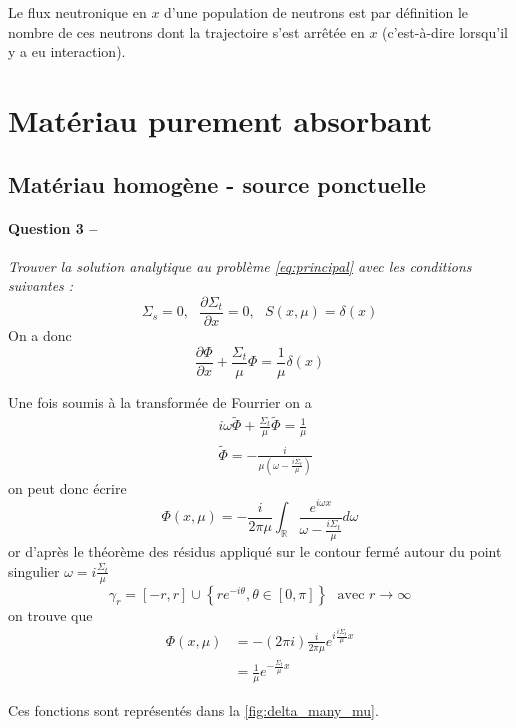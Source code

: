 \message{ !name(rapport_monte_carlo.tex)}\documentclass[12pt,a4paper]{article}
\newcommand{\dx}[1]{\dfrac{\partial #1}{\partial x}}
\newcommand{\question}[2]{\paragraph{Question #1 --}\hspace{-7pt}\textit{#2} \\}
\newcommand{\tphi}{\widetilde{\Phi}}
\begin{document}
Le flux neutronique en $x$ d'une population de neutrons est par définition le nombre de ces neutrons dont la trajectoire s'est arrêtée en $x$ (c'est-à-dire lorsqu'il y a eu interaction).

\section{Matériau purement absorbant}

\subsection{Matériau homogène - source ponctuelle}

\question{3}{Trouver la solution analytique au problème \autoref{eq:principal} avec les conditions suivantes :}

\begin{equation}
  \Sigma_s=0, ~~~ \dx{\Sigma_t} = 0, ~~~ S(x, \mu) = \delta(x)
\end{equation}
On a donc 
\begin{equation}
  \dx{\Phi} + \frac{\Sigma_t}{\mu} \Phi = \frac{1}{\mu} \delta(x)
\end{equation}

Une fois soumis à la transformée de Fourrier on a 
\begin{align}
  &i \omega \tphi + \frac{\Sigma_t}{\mu} \tphi = \frac{1}{\mu} \\
  &\tphi = -\frac{i}{\mu\left(\omega - \frac{i \Sigma_t}{\mu}\right)}
\end{align}
on peut donc écrire 
\begin{equation}
  \Phi (x, \mu) = -\frac{i}{2\pi\mu} \int_{\mathbb{R}} \frac{e^{i\omega x}}{\omega - \frac{i \Sigma_t}{\mu}} d\omega 
\end{equation}
or d'après le théorème des résidus appliqué sur le contour fermé autour du point singulier $\omega = i\frac{\Sigma_t}{\mu}$
\begin{equation}
  \gamma_r = [-r,r]\cup\left\{r e^{-i \theta}, \theta \in [0, \pi] \right\} ~~~ \mbox{avec } r \to \infty
\end{equation}
on trouve que
\begin{align}
  \Phi (x, \mu) &= - (2 \pi i) \frac{i}{2\pi\mu} e^{i \frac{i \Sigma_t}{\mu} x} \\
                &= \frac{1}{\mu} e^{-\frac{\Sigma_t}{\mu} x} 
\end{align}

Ces fonctions sont représentés dans la \autoref{fig:delta_many_mu}.
\end{document}
